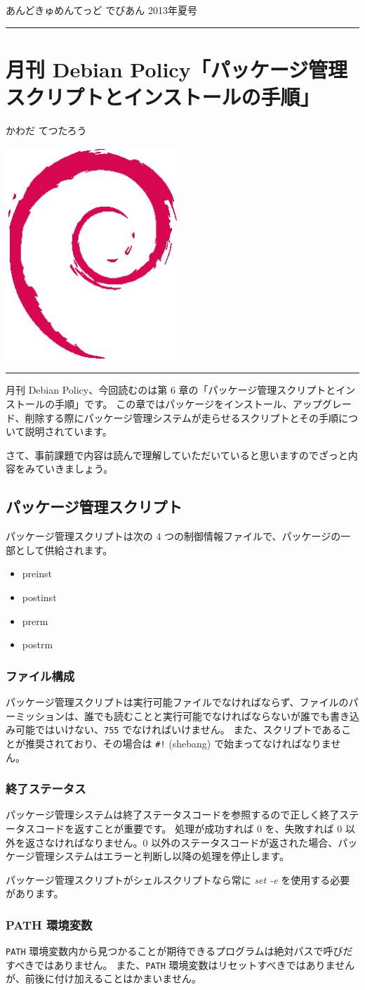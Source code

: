 \documentclass[mingoth,a4paper]{jsarticle}
\renewcommand{\dancersection}[2]{%
\newpage
あんどきゅめんてっど でびあん 2013年夏号
%
\vspace{0.1mm}\\
{\color{dancerdarkblue}\rule{\hsize}{2mm}}

%
%
\begin{minipage}[t]{0.6\hsize}
\color{dancerdarkblue}
\vspace{1cm}
\section{#1}
\hfill{}#2\\
\end{minipage}
\begin{minipage}[t]{0.4\hsize}
\vspace{-2cm}
\hfill{}\includegraphics[height=8cm]{image200502/openlogo-nd.eps}\\
\vspace{-5cm}
\end{minipage}
%
{\color{dancerlightblue}\rule{0.66\hsize}{2mm}}
%
\vspace{2cm}
}
\begin{document}
\dancersection{月刊 Debian Policy「パッケージ管理スクリプトとインストールの手順」}{かわだ てつたろう}

月刊 Debian Policy、今回読むのは第 6 章の「パッケージ管理スクリプトとインストールの手順」です。
この章ではパッケージをインストール、アップグレード、削除する際にパッケージ管理システムが走らせるスクリプトとその手順について説明されています。

さて、事前課題で内容は読んで理解していただいていると思いますのでざっと内容をみていきましょう。

\subsection{パッケージ管理スクリプト}
パッケージ管理スクリプトは次の 4 つの制御情報ファイルで、パッケージの一部として供給されます。

\begin{itemize}
\item preinst
\item postinst
\item prerm
\item postrm
\end{itemize}



\subsubsection{ファイル構成}
パッケージ管理スクリプトは実行可能ファイルでなければならず、ファイルのパーミッションは、誰でも読むことと実行可能でなければならないが誰でも書き込み可能ではいけない、{\tt 755} でなければいけません。
また、スクリプトであることが推奨されており、その場合は {\tt \#!} (shebang) で始まってなければなりません。

\subsubsection{終了ステータス}
パッケージ管理システムは終了ステータスコードを参照するので正しく終了ステータスコードを返すことが重要です。
処理が成功すれば 0 を、失敗すれば 0 以外を返さなければなりません。0 以外のステータスコードが返された場合、パッケージ管理システムはエラーと判断し以降の処理を停止します。

パッケージ管理スクリプトがシェルスクリプトなら常に {\it set -e} を使用する必要があります。

\subsubsection{PATH 環境変数}
{\tt PATH} 環境変数内から見つかることが期待できるプログラムは絶対パスで呼びだすべきではありません。
また、{\tt PATH} 環境変数はリセットすべきではありませんが、前後に付け加えることはかまいません。
\end{document}
